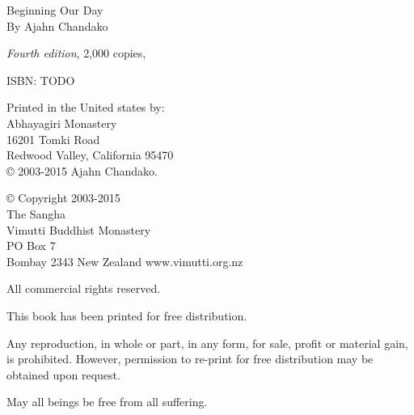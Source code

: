 \newpage
\raggedright

Beginning Our Day\\
By Ajahn Chandako

\textit{Fourth edition}, 2,000 copies, \the\year

ISBN: TODO

Printed in the United states by:\\
Abhayagiri Monastery\\
16201 Tomki Road\\
Redwood Valley, California 95470\\

© 2003-2015 Ajahn Chandako. 

© Copyright 2003-2015\\
The Sangha\\
Vimutti Buddhist Monastery\\
PO Box 7\\
Bombay 2343 New Zealand
www.vimutti.org.nz

All commercial rights reserved.

This book has been printed for free distribution.

Any reproduction, in whole or part, in any form, for sale, profit or material
gain, is prohibited. However, permission to re-print for free distribution may
be obtained upon request.

May all beings be free from all suffering.
